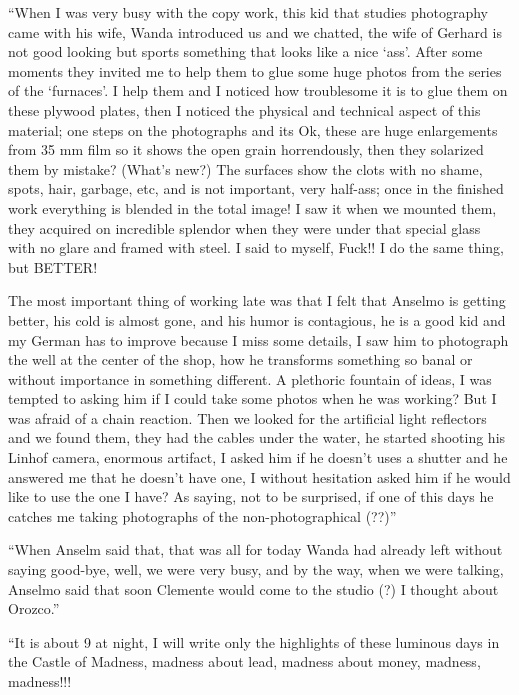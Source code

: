 \documentclass[smalldemyvopaper,11pt,twoside,onecolumn,openright,extrafontsizes]{memoir}
\begin{document}
“When I was very busy with the copy work, this kid that studies photography came with his wife, Wanda introduced us and we chatted, the wife of Gerhard is not good looking but sports something that looks like a nice ‘ass’. After some moments they invited me to help them to glue some huge photos from the series of the ‘furnaces’. I help them and I noticed how troublesome it is to glue them on these plywood plates, then I noticed the physical and technical aspect of this material; one steps on the photographs and its Ok, these are huge enlargements from 35 mm film so it shows the open grain horrendously, then they solarized them by mistake? (What’s new?) The surfaces show the clots with no shame, spots, hair, garbage, etc, and is not important, very half-ass; once in the finished work everything is blended in the total image! I saw it when we mounted them, they acquired on incredible splendor when they were under that special glass with no glare and framed with steel. I said to myself, Fuck!! I do the same thing, but BETTER!

The most important thing of working late was that I felt that Anselmo is getting better, his cold is almost gone, and his humor is contagious, he is a good kid and my German has to improve because I miss some details, I saw him to photograph the well at the center of the shop, how he transforms something so banal or without importance in something different. A plethoric fountain of ideas, I was tempted to asking him if I could take some photos when he was working? But I was afraid of a chain reaction. Then we looked for the artificial light reflectors and we found them, they had the cables under the water, he started shooting his Linhof camera, enormous artifact, I asked him if he doesn’t uses a shutter and he answered me that he doesn’t have one, I without hesitation asked him if he would like to use the one I have? As saying, not to be surprised, if one of this days he catches me taking photographs of the non-photographical (??)”

\ornamentbreak

“When Anselm said that, that was all for today Wanda had already left without saying good-bye, well, we were very busy, and by the way, when we were talking, Anselmo said that soon Clemente would come to the studio (?) I thought about Orozco.”

\ornamentbreak

“It is about 9 at night, I will write only the highlights of these luminous days in the Castle of Madness, madness about lead, madness about money, madness, madness!!!
\end{document}
